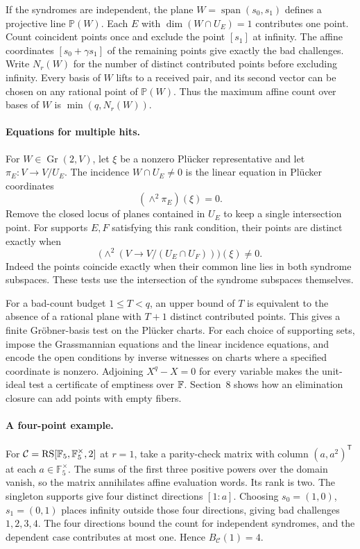 If the syndromes are independent, the plane \(W=\operatorname{span}(s_0,s_1)\)
defines a projective line \(\mathbb P(W)\). Each \(E\) with
\(\dim(W\cap U_E)=1\) contributes one point. Count coincident points once
and exclude the point \([s_1]\) at infinity. The affine coordinates
\([s_0+\gamma s_1]\) of the remaining points give exactly the bad
challenges. Write \(N_r(W)\) for the number of distinct contributed points
before excluding infinity. Every basis of \(W\) lifts to a received pair,
and its second vector can be chosen on any rational point of
\(\mathbb P(W)\). Thus the maximum affine count over bases of \(W\) is
\(\min(q,N_r(W))\).

\paragraph{Equations for multiple hits.}
For \(W\in\operatorname{Gr}(2,V)\), let \(\xi\) be a nonzero Pl\"ucker
representative and let \(\pi_E:V\to V/U_E\). The incidence
\(W\cap U_E\ne0\) is the linear equation in Pl\"ucker coordinates
\[
  (\wedge^2\pi_E)(\xi)=0.
\]
Remove the closed locus of planes contained in \(U_E\) to keep a single
intersection point. For supports \(E,F\) satisfying this rank condition,
their points are distinct exactly when
\[
  \bigl(\wedge^2(V\to V/(U_E\cap U_F))\bigr)(\xi)\ne0.
\]
Indeed the points coincide exactly when their common line lies in both
syndrome subspaces. These tests use the intersection of the syndrome
subspaces themselves.

For a bad-count budget \(1\le T<q\), an upper bound of \(T\) is equivalent
to the absence of a rational plane with \(T+1\) distinct contributed
points. This gives a finite Gr\"obner-basis test on the Pl\"ucker charts.
For each choice of supporting sets, impose the Grassmannian equations
and the linear incidence equations, and encode the open conditions by
inverse witnesses on charts where a specified coordinate is nonzero.
Adjoining \(X^q-X=0\) for every variable makes the unit-ideal test a
certificate of emptiness over \(\mathbb{F}\). Section~8 shows how an elimination
closure can add points with empty fibers.

\paragraph{A four-point example.}
For \(\mathcal C=\operatorname{RS}[\mathbb F_5,\mathbb F_5^\times,2]\) at \(r=1\),
take a parity-check matrix with column \((a,a^2)^{\mathsf T}\) at each
\(a\in\mathbb F_5^\times\). The sums of the first three positive powers
over the domain vanish, so the matrix annihilates affine evaluation
words. Its rank is two. The singleton supports give four distinct
directions \([1:a]\). Choosing \(s_0=(1,0)\), \(s_1=(0,1)\) places infinity
outside those four directions, giving bad challenges \(1,2,3,4\). The
four directions bound the count for independent syndromes, and the
dependent case contributes at most one. Hence \(B_{\mathcal C}(1)=4\).

